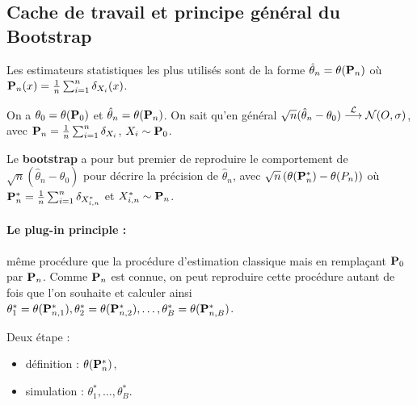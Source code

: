 \subsection{Cache de travail et principe général du Bootstrap}

	Les estimateurs statistiques les plus utilisés sont de la forme $\hat{\theta}_n = \theta(\mathbf{P}_n)$ où $\mathbf{P}_n(x) = \frac{1}{n} \sum_{i = 1}^n \delta_{X_i}(x)$.

	On a $\theta_0 = \theta(\mathbf{P}_0)$ et $\hat{\theta}_n = \theta(\mathbf{P}_n)$.
	On sait qu'en général $\sqrt{n}(\hat{\theta}_n - \theta_0) \overset{\mathcal{L}}{\longrightarrow} \mathcal{N}(O,\sigma)$, avec $\mathbf{P}_n = \frac{1}{n} \sum_{i = 1}^n \delta_{X_i}$, $X_i \sim \mathbf{P}_0$.

	\begin{defn}
		Le \textbf{bootstrap} a pour but premier de reproduire le comportement de $\sqrt{n}(\hat{\theta}_n - \theta_0)$ pour décrire la précision de $\hat{\theta}_n$, avec $\sqrt{n} \left( \theta(\mathbf{P}_n^*) - \theta(P_n) \right)$ où $\mathbf{P}_n^* = \frac{1}{n} \sum_{i = 1}^n \delta_{X_{i,n}^*}$ et $X_{i,n}^* \sim \mathbf{P}_n$.
	\end{defn}

	\paragraph{Le plug-in principle :} même procédure que la procédure d'estimation classique mais en remplaçant $\mathbf{P}_0$ par $\mathbf{P}_n$.
	Comme $\mathbf{P}_n$ est connue, on peut reproduire cette procédure autant de fois que l'on souhaite et calculer ainsi $\theta_1^* = \theta(\mathbf{P}_{n,1}^*), \theta_2^* = \theta(\mathbf{P}_{n,2}^*), \ldots, \theta_B^* = \theta(\mathbf{P}_{n,B}^*)$.

	Deux étape :
	\begin{itemize}
		\item[\textbullet] définition : $\theta(\mathbf{P}_n^*)$,
		\item[\textbullet] simulation : $\theta_1^*, \ldots, \theta_B^*$.
	\end{itemize}

